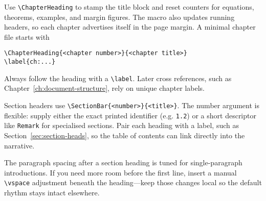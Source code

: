\label{ch:document-structure}

\label{sec:chapter-frame}


Use \verb|\ChapterHeading| to stamp the title block and reset counters for
equations, theorems, examples, and margin figures. The macro also updates running
headers, so each chapter advertises itself in the page margin. A minimal chapter
file starts with
\begin{verbatim}
\ChapterHeading{<chapter number>}{<chapter title>}
\label{ch:...}
\end{verbatim}
Always follow the heading with a \verb|\label|. Later cross references, such as
Chapter~\ref{ch:document-structure}, rely on unique chapter labels.

\label{sec:section-heads}


Section headers use \verb|\SectionBar{<number>}{<title>}|. The number argument is
flexible: supply either the exact printed identifier (e.g. \verb|1.2|) or a short
descriptor like \verb|Remark| for specialised sections. Pair each heading with a
label, such as Section~\ref{sec:section-heads}, so the table of contents can link
directly into the narrative.

The paragraph spacing after a section heading is tuned for single-paragraph
introductions. If you need more room before the first line, insert a manual
\verb|\vspace| adjustment beneath the heading—keep those changes local so the
default rhythm stays intact elsewhere.

